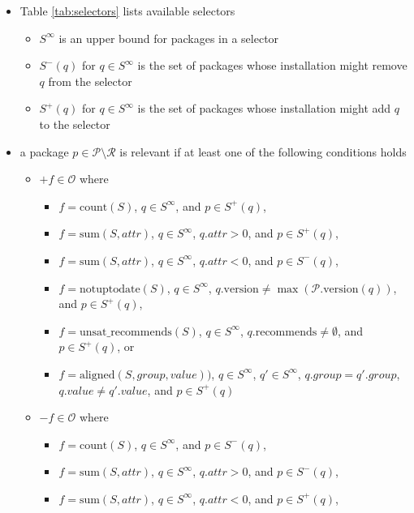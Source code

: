 \documentclass[a4paper,english]{article}
\newcommand{\universe}{\mathcal{P}}
\newcommand{\removed}{\mathcal{R}}
\newcommand{\optimization}{\mathcal{O}}
\newcommand{\version}{\mathrm{version}}
\newcommand{\recommends}{\mathrm{recommends}}
\newcommand{\funsatrecom}{\mathrm{unsat\_recommends}}
\newcommand{\fcount}{\mathrm{count}}
\newcommand{\fsum}{\mathrm{sum}}
\newcommand{\faligned}{\mathrm{aligned}}
\newcommand{\fnotuptodate}{\mathrm{notuptodate}}
\newcommand{\selmax}{S^\infty}
\newcommand{\reasonmax}[1]{S^+(#1)}
\newcommand{\reasonmin}[1]{S^-(#1)}
\newcommand{\attr}[1]{\mathit{#1}}
\begin{document}
\begin{itemize}
  \item Table \ref{tab:selectors} lists available selectors
    \begin{itemize}
      \item $\selmax$ is an upper bound for packages in a selector
      \item $\reasonmin{q}$ for $q\in\selmax$ is the set of packages whose installation might remove $q$ from the selector
      \item $\reasonmax{q}$ for $q\in\selmax$ is the set of packages whose installation might add $q$ to the selector
    \end{itemize}
  \item a package $p \in \universe \setminus \removed$ is relevant if at least one of the following conditions holds
    \begin{itemize}
      \item $+f \in \optimization$ where
        \begin{itemize}
          \item $f = \fcount(S)$, $q \in \selmax$, and $p \in \reasonmax{q}$,
          \item $f = \fsum(S,\attr{attr})$, $q \in \selmax$, $q.\attr{attr} > 0$, and $p \in \reasonmax{q}$,
          \item $f = \fsum(S,\attr{attr})$, $q \in \selmax$, $q.\attr{attr} < 0$, and $p \in \reasonmin{q}$,
          \item $f = \fnotuptodate(S)$, $q \in \selmax$, $q.\version \neq \max(\universe.\version(q))$, and $p \in \reasonmax{q}$,
          \item $f = \funsatrecom(S)$, $q \in \selmax$, $q.\recommends \neq \emptyset$, and $p \in \reasonmax{q}$, or
          \item $f = \faligned(S,\attr{group},\attr{value}))$, $q\in \selmax$, $q' \in \selmax$, $q.\attr{group} = q'.\attr{group}$, $q.\attr{value} \neq q'.\attr{value}$, and $p \in \reasonmax{q}$\\
        \end{itemize}
      \item $-f \in \optimization$ where
        \begin{itemize}
          \item $f = \fcount(S)$, $q \in \selmax$, and $p \in \reasonmin{q}$,
          \item $f = \fsum(S,\attr{attr})$, $q \in \selmax$, $q.\attr{attr} > 0$, and $p \in \reasonmin{q}$,
          \item $f = \fsum(S,\attr{attr})$, $q \in \selmax$, $q.\attr{attr} < 0$, and $p \in \reasonmax{q}$,

\end{itemize}
\end{itemize}
\end{itemize}
\end{document}
